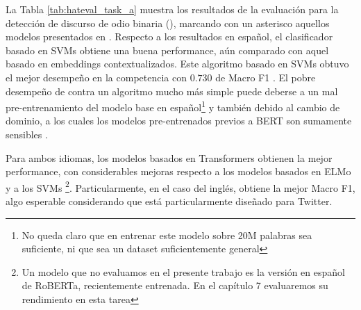 La Tabla \ref{tab:hateval_task_a} muestra los resultados de la evaluación para la detección de discurso de odio binaria (\subtaska{}), marcando con un asterisco aquellos modelos presentados en \citet{perez-2019-atalaya}. Respecto a los resultados en español, el clasificador basado en SVMs obtiene una buena performance, aún comparado con aquel basado en embeddings contextualizados. Este algoritmo basado en SVMs obtuvo el mejor desempeño en la competencia con $0.730$ de Macro F1 \cite{hateval2019semeval}. El pobre desempeño de \elmo{} contra un algoritmo mucho más simple puede deberse a un mal pre-entrenamiento del modelo base en español\footnote{No queda claro que en entrenar este modelo sobre 20M palabras sea suficiente, ni que sea un dataset suficientemente general} y también debido al cambio de dominio, a los cuales los modelos pre-entrenados previos a BERT son sumamente sensibles \cite{hendrycks-etal-2020-pretrained}.

Para ambos idiomas, los modelos basados en Transformers \cite{vaswani2017attention} obtienen la mejor performance, con considerables mejoras respecto a los modelos basados en ELMo y a los SVMs \footnote{Un modelo que no evaluamos en el presente trabajo es la versión en español de RoBERTa, recientemente entrenada. En el capítulo 7 evaluaremos su rendimiento en esta tarea}. Particularmente, en el caso del inglés, \bertweet{} \cite{dat2020bertweet} obtiene la mejor Macro F1, algo esperable considerando que está particularmente diseñado para Twitter.


